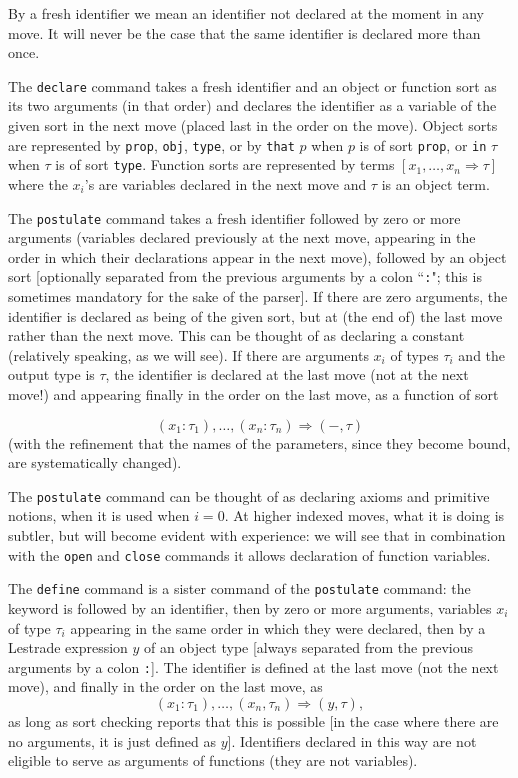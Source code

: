 \documentclass[12pt]{article}
\begin{document}
By a fresh identifier we mean an identifier not declared at the moment in any move.  It will never be the case that the same identifier is declared more than once.

The {\tt declare} command takes a fresh identifier and an object or function sort as its two arguments (in that order) and declares the identifier as a variable
of the given sort in the next move (placed last in the order on the move).   Object sorts are represented by {\tt prop}, {\tt obj}, {\tt type}, or by {\tt that} $p$ when $p$ is of sort {\tt prop}, or {\tt in} $\tau$ when $\tau$ is of sort {\tt type}.  Function sorts are represented by terms $[x_1,\ldots,x_n \Rightarrow \tau]$
where the $x_i$'s are variables declared in the next move and $\tau$ is an object term.

The {\tt postulate} command takes a fresh identifier followed by zero or more arguments (variables declared previously at the next move, appearing in the order in which their declarations appear in the next move), followed
by an object sort  [optionally separated from the previous arguments by a colon ``{\tt :}";  this is sometimes mandatory for the sake of the parser].  If there are zero arguments, the identifier is declared as being of the given sort, but at (the end of) the last move rather than the next move.  This can be thought of as declaring a constant (relatively speaking, as we will see).  If there are arguments $x_i$ of types $\tau_i$
and the output type is $\tau$, the identifier is declared at the last move (not at the next move!) and appearing finally in the order on the last move, as a function of sort

$$(x_1:\tau_1),\ldots,(x_n:\tau_n) \Rightarrow (-,\tau)$$ (with the refinement that the names of the parameters, since they become bound, are systematically changed).

The {\tt postulate} command can be thought of as declaring axioms and primitive notions, when it is used when $i=0$.  At higher indexed moves, what it is doing is subtler, but will become evident with experience:  we will see that in combination with the {\tt open} and {\tt close} commands it allows
declaration of function variables.

The {\tt define} command is a sister command of the {\tt postulate} command:  the keyword is followed by an identifier, then by zero or more arguments, variables $x_i$ of type $\tau_i$ appearing in the same order in which they were declared, then by a Lestrade expression $y$ of an object type [always separated from the previous arguments by a colon {\tt :}].  The identifier is defined at the last move (not the next move), and finally in the order on the last move,  as $$(x_1:\tau_1),\ldots,(x_n,\tau_n) \Rightarrow (y,\tau),$$ as long as sort checking reports that this is possible [in the case where there are no arguments, it is just defined as $y$].   Identifiers declared in this way are not eligible to serve as arguments of functions (they  are not variables).  
\end{document}
